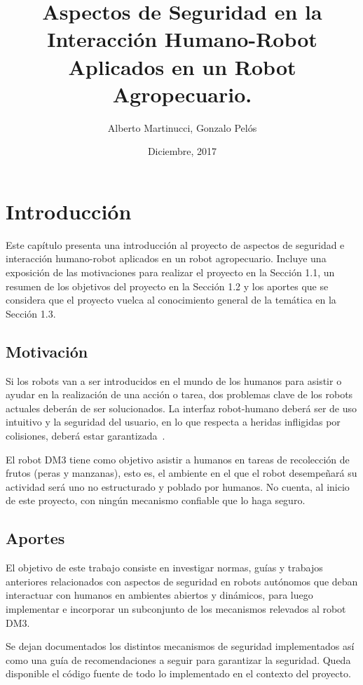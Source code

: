 \documentclass[withindex,glossary]{cam-thesis}
\title{Aspectos de Seguridad en la Interacción Humano-Robot Aplicados en un Robot Agropecuario.}
\author{Alberto Martinucci, Gonzalo Pelós}
\date{Diciembre, 2017}
\begin{document}
\frontmatter{}
\printthesisglossary
\chapter{Introducción}
Este capítulo presenta una introducción al proyecto de aspectos de seguridad e interacción humano-robot aplicados en un robot agropecuario. Incluye una exposición de las motivaciones para realizar el proyecto en la Sección 1.1, un resumen de los objetivos del proyecto en la Sección 1.2 y los aportes que se considera que el proyecto vuelca al conocimiento general de la temática en la Sección 1.3.
 

\section{Motivación} \label{sec: Introduccion :: Motivacion}
Si los robots van a ser introducidos en el mundo de los humanos para asistir o ayudar en la realización de una acción o tarea, dos problemas clave de los robots actuales deberán de ser solucionados. La interfaz robot-humano deberá ser de uso intuitivo y la seguridad del usuario, en lo que respecta a heridas infligidas por colisiones, deberá estar garantizada~\cite{Heinzmann2003}.

El robot DM3 tiene como objetivo asistir a humanos en tareas de recolección de frutos (peras y manzanas), esto es, el ambiente en el que el robot desempeñará su actividad será uno no estructurado y poblado por humanos. No cuenta, al inicio de este proyecto, con ningún mecanismo confiable que lo haga seguro.

\section{Aportes}
El objetivo de este trabajo consiste en investigar normas, guías y trabajos anteriores relacionados con aspectos de seguridad en robots autónomos que deban interactuar con humanos en ambientes abiertos y dinámicos, para luego implementar e incorporar un subconjunto de los mecanismos relevados al robot DM3.

Se dejan documentados los distintos mecanismos de seguridad implementados así como una guía de recomendaciones a seguir para garantizar la seguridad. Queda disponible el código fuente de todo lo implementado en el contexto del proyecto.
\end{document}
